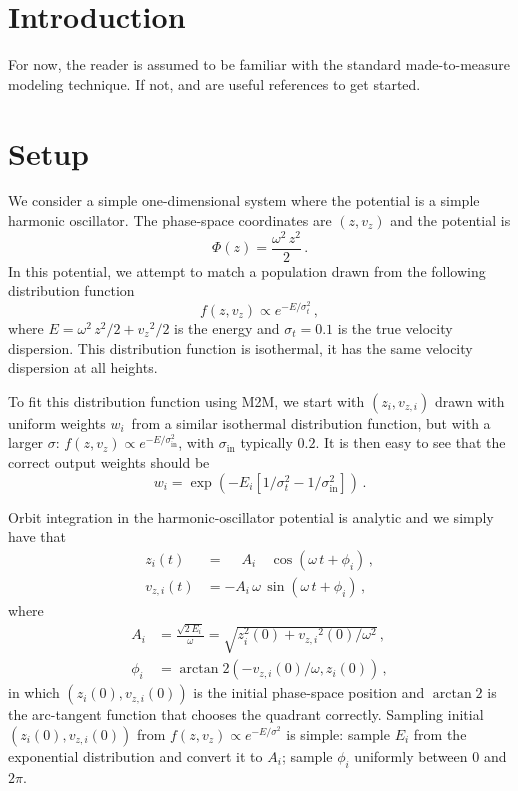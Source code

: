 \documentclass[12pt,preprint]{aastex}
\newcommand{\vz}{\ensuremath{v_z}}
\newcommand{\vzi}{\ensuremath{v_{z,i}}}
\newcommand{\zi}{\ensuremath{z_i}}
\newcommand{\wi}{\ensuremath{w_i}}
\newcommand{\Ei}{\ensuremath{E_i}}
\newcommand{\Ai}{\ensuremath{A_i}}
\newcommand{\phii}{\ensuremath{\phi_i}}
\begin{document}
\section{Introduction}

For now, the reader is assumed to be familiar with the standard
made-to-measure modeling technique. If not, \citet{Syer96a} and
\citet{Dehnen09a} are useful references to get started.

\section{Setup}

We consider a simple one-dimensional system where the potential is a
simple harmonic oscillator. The phase-space coordinates are $(z,\vz)$
and the potential is
\begin{equation}
  \Phi(z) = \frac{\omega^2\,z^2}{2}\,.
\end{equation}
In this potential, we attempt to match a population drawn from the
following distribution function
\begin{equation}
  f(z,\vz) \propto e^{-E/\sigma_t^2}\,,
\end{equation}
where $E = \omega^2\,z^2 / 2 + \vz^2/2$ is the energy and $\sigma_t =
0.1$ is the true velocity dispersion. This distribution function is
isothermal, it has the same velocity dispersion at all heights.

To fit this distribution function using M2M, we start with
$(\zi,\vzi)$ drawn with uniform weights \wi\ from a similar isothermal
distribution function, but with a larger $\sigma$: $f(z,\vz) \propto
e^{-E/\sigma_{\mathrm{in}}^2}$, with $\sigma_{\mathrm{in}}$ typically
$0.2$. It is then easy to see that the correct output weights should
be
\begin{equation}
  \wi = \exp\left( -\Ei\left[1/\sigma_t^2-1/\sigma_{\mathrm{in}}^2\right]\right)\,.
\end{equation}

Orbit integration in the harmonic-oscillator potential is analytic and
we simply have that
\begin{align}\label{eq:zit}
  \zi(t) & = \phantom{-}\Ai\phantom{\,\omega}\,\cos\left(\omega\,t+\phii\right)\,,\\
  \vzi(t) & = -\Ai\,\omega\,\sin\left(\omega\,t+\phii\right)\,,\label{eq:vzit}
\end{align}
where
\begin{align}\label{eq:Ai}
  A_i  & = \frac{\sqrt{2\,E_i}}{\omega} = \sqrt{z_i^2(0)+\vzi^2(0)/\omega^2}\,,\\
  \phii & = \arctan\!2(-\vzi(0)/\omega,\zi(0))\,,\label{eq:phii}
\end{align}
in which $(\zi(0),\vzi(0))$ is the initial phase-space position and
$\arctan\!2$ is the arc-tangent function that chooses the quadrant
correctly. Sampling initial $(\zi(0),\vzi(0))$ from $f(z,\vz) \propto
e^{-E/\sigma^2}$ is simple: sample $\Ei$ from the exponential
distribution and convert it to $\Ai$; sample $\phii$ uniformly between
$0$ and $2\pi$.
\end{document}
